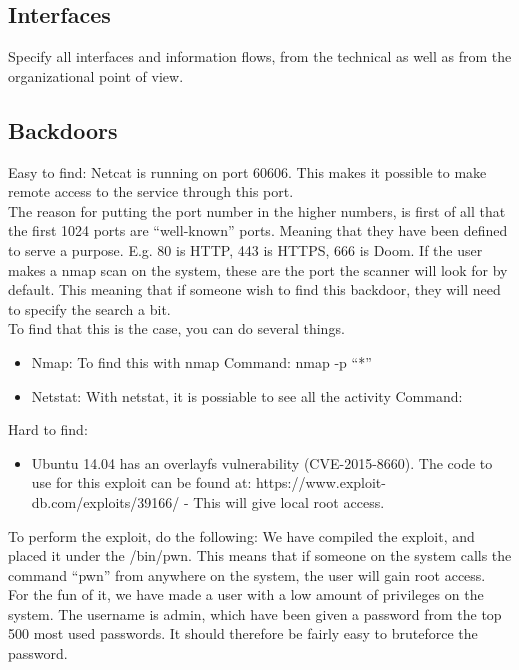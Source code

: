 \documentclass{article}
\begin{document}
\subsection{Interfaces}

Specify  all interfaces and  information flows, from the technical as well as from the
  organizational point of view.

\subsection{Backdoors}

Easy to find: 
Netcat is running on port 60606. This makes it possible to make remote access to the service through this port.\\

The reason for putting the port number in the higher numbers, is first of all that the first 1024 ports are “well-known” ports.  Meaning that they have been defined to serve a purpose. E.g. 80 is HTTP, 443 is HTTPS, 666 is Doom. If the user makes a nmap scan on the system, these are the port the scanner will look for by default. This meaning that if someone wish to find this backdoor, they will need to specify the search a bit.\\

To find that this is the case, you can do several things.
\begin{itemize}
\item Nmap: To find this with nmap 
Command: nmap -p “*”
\item	Netstat: With netstat, it is possiable to see all the activity 
Command:
\end{itemize}

Hard to find: 
\begin{itemize}
\item Ubuntu 14.04 has an overlayfs vulnerability (CVE-2015-8660). The code to use for this exploit can be found at: https://www.exploit-db.com/exploits/39166/ - This will give local root access.
\end{itemize}

To perform the exploit, do the following:
We have compiled the exploit, and placed it under the /bin/pwn. This means that if someone on the system calls the command “pwn” from anywhere on the system, the user will gain root access. \\

For the fun of it, we have made a user with a low amount of privileges on the system. The username is admin, which have been given a password from the top 500 most used passwords. It should therefore be fairly easy to bruteforce the password. \\
\end{document}
